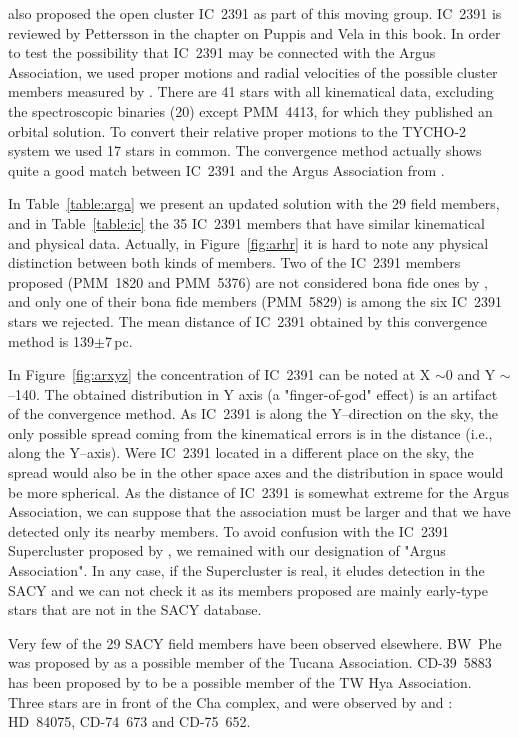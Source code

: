 \documentclass[11pt,twoside]{book}
\begin{document}
\citet{makarov00} also proposed the open cluster IC~2391 as part of this moving group.
IC~2391 is reviewed by Pettersson in the chapter on Puppis and Vela in this book.
In order to test the possibility that IC~2391 may be connected with the Argus Association,
we used proper motions and  radial velocities of the possible cluster members
measured by \citet{platais07}.
There are 41 stars with all kinematical data, excluding the spectroscopic
binaries (20) except PMM~4413,
for which they published an orbital solution.
To convert their relative proper motions to the TYCHO-2 system we used 17 stars in common.
The convergence method actually shows quite a good match between IC~2391 and the
Argus Association from \citet{torres03}.


In  Table~\ref{table:arga} we present an updated solution with the 29 field
members, and in Table~\ref{table:ic} the 35 IC~2391 members
that have similar kinematical and physical data. Actually, in
Figure~\ref{fig:arhr} it is hard to note
any physical distinction between both kinds of members.
Two of the IC~2391 members proposed (PMM~1820 and PMM~5376) are not considered
bona fide ones by \citet{platais07},
and only one of their bona fide members (PMM~5829) is among the six IC~2391
stars we rejected.
The mean distance of IC~2391 obtained by this convergence method is 139$\pm$7\,pc.


In Figure~\ref{fig:arxyz} the concentration of IC~2391 can be noted at X $\sim$0
and Y $\sim$--140.
The obtained distribution in Y axis (a "finger-of-god" effect) is an artifact of
the convergence method.
As IC~2391 is along the Y--direction on the sky, the only possible spread coming
from the kinematical errors is in the distance (i.e., along the Y--axis).
Were IC~2391 located in a different place on the sky, the spread would
also be  in the other space axes and the distribution in space would be more spherical.
As the distance of IC~2391 is somewhat extreme for the Argus Association,
we can suppose that the association must be larger and that we have detected only its nearby members.
To avoid confusion with the  IC~2391 Supercluster proposed by \citet{eggen91},
we remained with our designation of "Argus Association".
In any case, if the Supercluster is real, it eludes detection in the SACY
and we can not check it as its members proposed are mainly early-type stars
that are not in the SACY database.


Very few of the 29 SACY field members have been observed elsewhere.
BW~Phe was proposed by \citet{zuckerman01b} as a possible member of the
Tucana Association.  CD-39~5883 has been proposed by \citet{reid03}
to be a possible member of the TW Hya Association.  Three stars are in
front of the Cha complex, and were observed by \citet{covino97} and
\citet {guenther07}: HD~84075, CD-74~673 and CD-75~652.
\end{document}

